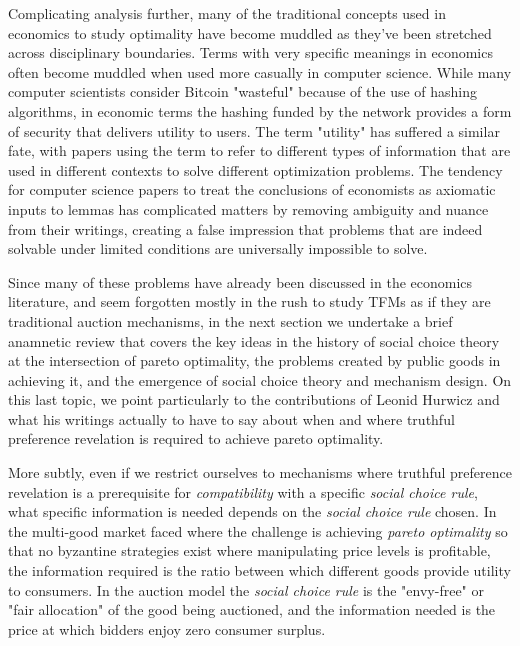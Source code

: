 \documentclass[sigconf,anonymous]{aamas}
\begin{document}
Complicating analysis further, many of the traditional concepts used in economics to study optimality have become muddled as they've been stretched across disciplinary boundaries. Terms with very specific meanings in economics often become muddled when used more casually in computer science. While many computer scientists consider Bitcoin "wasteful" because of the use of hashing algorithms, in economic terms the hashing funded by the network provides a form of security that delivers utility to users. The term "utility" has suffered a similar fate, with papers using the term to refer to different types of information that are used in different contexts to solve different optimization problems. The tendency for computer science papers to treat the conclusions of economists as axiomatic inputs to lemmas has complicated matters by removing ambiguity and nuance from their writings, creating a false impression that problems that are indeed solvable under limited conditions are universally impossible to solve.

Since many of these problems have already been discussed in the economics literature, and seem forgotten mostly in the rush to study TFMs as if they are traditional auction mechanisms, in the next section we undertake a brief anamnetic review that covers the key ideas in the history of social choice theory at the intersection of pareto optimality, the problems created by public goods in achieving it, and the emergence of social choice theory and mechanism design. On this last topic, we point particularly to the contributions of Leonid Hurwicz and what his writings actually to have to say about when and where truthful preference revelation is required to achieve pareto optimality.








More subtly, even if we restrict ourselves to mechanisms where truthful preference revelation is a prerequisite for \textit{compatibility} with a specific \textit{social choice rule}, what specific information is needed depends on the \textit{social choice rule} chosen. In the multi-good market faced where the challenge is achieving \textit{pareto optimality} so that no byzantine strategies exist where manipulating price levels is profitable, the information required is the ratio between which different goods provide utility to consumers. In the auction model the \textit{social choice rule} is the "envy-free" or "fair allocation" of the good being auctioned, and the information needed is the price at which bidders enjoy zero consumer surplus.
\end{document}
